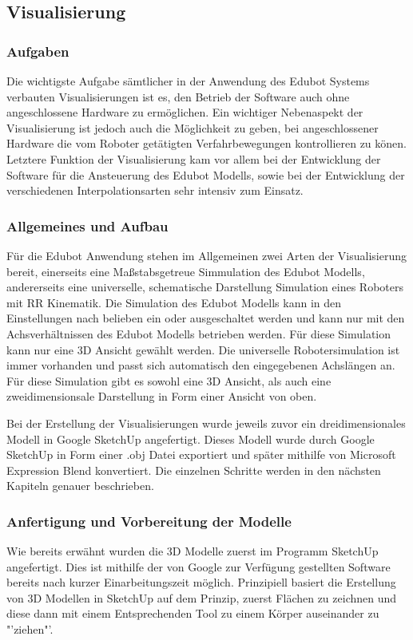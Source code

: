 \subsection{Visualisierung}

\subsubsection{Aufgaben}
Die wichtigste Aufgabe sämtlicher in der Anwendung des Edubot Systems verbauten Visualisierungen ist es, den Betrieb der Software auch ohne angeschlossene Hardware zu ermöglichen. Ein wichtiger Nebenaspekt der Visualisierung ist jedoch auch die Möglichkeit zu geben, bei angeschlossener Hardware die vom Roboter getätigten Verfahrbewegungen kontrollieren zu könen.
Letztere Funktion der Visualisierung kam vor allem bei der Entwicklung der Software für die Ansteuerung des Edubot Modells, sowie bei der Entwicklung der verschiedenen Interpolationsarten sehr intensiv zum Einsatz. 
\subsubsection{Allgemeines und Aufbau}
Für die Edubot Anwendung stehen im Allgemeinen zwei Arten der Visualisierung bereit, einerseits eine Maßstabsgetreue Simmulation des Edubot Modells, andererseits eine universelle, schematische Darstellung Simulation eines Roboters mit RR Kinematik. 
Die Simulation des Edubot Modells kann in den Einstellungen nach belieben ein oder ausgeschaltet werden und kann nur mit den Achsverhältnissen des Edubot Modells betrieben werden. Für diese Simulation kann nur eine 3D Ansicht gewählt werden.
Die universelle Robotersimulation ist immer vorhanden und passt sich automatisch den eingegebenen Achslängen an. Für diese Simulation gibt es sowohl eine 3D Ansicht, als auch eine zweidimensionsale Darstellung in Form einer Ansicht von oben. 

Bei der Erstellung der Visualisierungen wurde jeweils zuvor ein dreidimensionales Modell in Google SketchUp angefertigt. Dieses Modell wurde durch Google SketchUp in Form einer .obj Datei exportiert und später mithilfe von Microsoft Expression Blend konvertiert. Die einzelnen Schritte werden in den nächsten Kapiteln genauer beschrieben.
\subsubsection{Anfertigung und Vorbereitung der Modelle}
Wie bereits erwähnt wurden die 3D Modelle zuerst im Programm SketchUp angefertigt. Dies ist mithilfe der von Google zur Verfügung gestellten Software bereits nach kurzer Einarbeitungszeit möglich. 
Prinzipiell basiert die Erstellung von 3D Modellen in SketchUp auf dem Prinzip, zuerst Flächen zu zeichnen und diese dann mit einem Entsprechenden Tool zu einem Körper auseinander zu "'ziehen"'.


